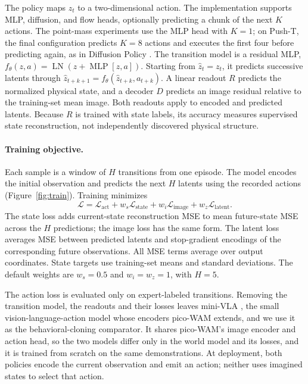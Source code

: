 \documentclass[11pt]{article}
\begin{document}
The policy maps $z_t$ to a two-dimensional action. The implementation supports MLP, diffusion, and flow heads, optionally predicting a chunk of the next $K$ actions. The point-mass experiments use the MLP head with $K=1$; on Push-T, the final configuration predicts $K=8$ actions and executes the first four before predicting again, as in Diffusion Policy \citep{chi2023diffusion}. The transition model is a residual MLP, $f_\theta(z,a)=\operatorname{LN}(z+\operatorname{MLP}[z,a])$. Starting from $\hat z_t=z_t$, it predicts successive latents through $\hat z_{t+k+1}=f_\theta(\hat z_{t+k},a_{t+k})$. A linear readout $R$ predicts the normalized physical state, and a decoder $D$ predicts an image residual relative to the training-set mean image. Both readouts apply to encoded and predicted latents. Because $R$ is trained with state labels, its accuracy measures supervised state reconstruction, not independently discovered physical structure.

\paragraph{Training objective.} Each sample is a window of $H$ transitions from one episode. The model encodes the initial observation and predicts the next $H$ latents using the recorded actions (Figure~\ref{fig:train}). Training minimizes
\begin{equation}
\mathcal L=\mathcal L_{\mathrm{act}}+w_s\mathcal L_{\mathrm{state}}
+w_i\mathcal L_{\mathrm{image}}+w_z\mathcal L_{\mathrm{latent}}.
\label{eq:loss}
\end{equation}
The state loss adds current-state reconstruction MSE to mean future-state MSE across the $H$ predictions; the image loss has the same form. The latent loss averages MSE between predicted latents and stop-gradient encodings of the corresponding future observations. All MSE terms average over output coordinates. State targets use training-set means and standard deviations. The default weights are $w_s=0.5$ and $w_i=w_z=1$, with $H=5$.

The action loss is evaluated only on expert-labeled transitions. Removing the transition model, the readouts and their losses leaves mini-VLA \citep{pandya2025minivla}, the small vision-language-action model whose encoders pico-WAM extends, and we use it as the behavioral-cloning comparator. It shares pico-WAM's image encoder and action head, so the two models differ only in the world model and its losses, and it is trained from scratch on the same demonstrations. At deployment, both policies encode the current observation and emit an action; neither uses imagined states to select that action.
\end{document}
